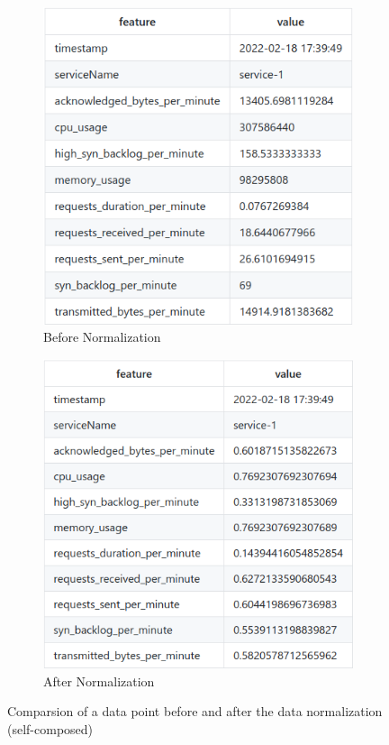 \begin{figure}[H]
    \centering
    \begin{subfigure}[b]{0.48\textwidth}
        \centering
        \includegraphics[width=\textwidth]{assets/implementation/before-normalization.png}
        \caption{Before Normalization}
        \label{fig:before-normalization}
    \end{subfigure}
    \hfill
    \begin{subfigure}[b]{0.49\textwidth}
        \centering
        \includegraphics[width=\textwidth]{assets/implementation/after-normalization.png}
        \caption{After Normalization}
        \label{fig:after-normalization}
    \end{subfigure}
    \hfill
       \caption{Comparsion of a data point before and after the data normalization (self-composed)}
\end{figure}

